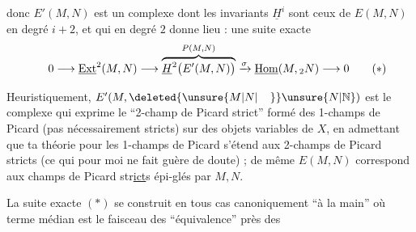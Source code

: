 
donc $E'(M,N)$ est un complexe dont les invariants $\underline{H}^{i}$ sont ceux de $E(M,N)$ en degré $i+2$, et qui en degré $2$ donne lieu : une suite exacte
\[
0\longrightarrow\underline{\mathrm{Ext}}^{2}(M,N)\longrightarrow
\overbrace{\underline{H}^{2}\bigl(E'(M,N)\bigr)}^{P(M,N)}
\xrightarrow{\sigma}\underline{\mathrm{Hom}}(M,{}_{2}N)\longrightarrow 0
\tag*{\makebox[0pt][r]{\makebox[\displaywidth][l]{$(*)$}}}
\]

Heuristiquement, $E'(M,\deleted{\unsure{M|N|\phantom{M}}}\unsure{N|\mathbb{N}})$ est le complexe qui exprime le ``2-champ de Picard strict'' formé des 1-champs de Picard (pas nécessairement stricts)  sur des objets variables de $X$, en admettant que ta théorie pour les 1-champs de Picard  s'étend aux 2-champs de Picard stricts (ce qui pour moi ne fait guère de doute) ; de même $E(M,N)$ correspond aux champs de Picard str\uline{ict}s épi-glés par $M,N$.

La suite exacte $(*)$ se construit en tous cas canoniquement ``à la main''\unsure{,|)} où  terme médian est le faisceau des    ``équivalence'' près des

